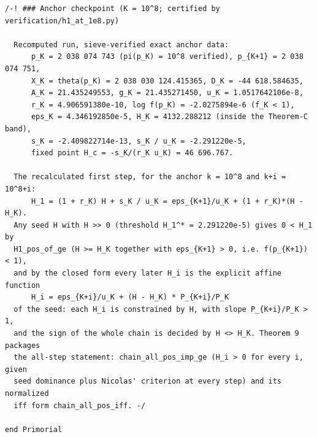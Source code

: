 \documentclass[11pt]{article}
\theoremstyle{remark}
\begin{document}
\begin{verbatim}
/-! ### Anchor checkpoint (K = 10^8; certified by verification/h1_at_1e8.py)

  Recomputed run, sieve-verified exact anchor data:
      p_K = 2 038 074 743 (pi(p_K) = 10^8 verified), p_{K+1} = 2 038 074 751,
      X_K = theta(p_K) = 2 038 030 124.415365, D_K = -44 618.584635,
      A_K = 21.435249553, g_K = 21.435271450, u_K = 1.0517642106e-8,
      r_K = 4.906591380e-10, log f(p_K) = -2.0275894e-6 (f_K < 1),
      eps_K = 4.346192850e-5, H_K = 4132.288212 (inside the Theorem-C band),
      s_K = -2.409822714e-13, s_K / u_K = -2.291220e-5,
      fixed point H_c = -s_K/(r_K u_K) = 46 696.767.

  The recalculated first step, for the anchor k = 10^8 and k+i = 10^8+i:
      H_1 = (1 + r_K) H + s_K / u_K = eps_{K+1}/u_K + (1 + r_K)*(H - H_K).
  Any seed H with H >> 0 (threshold H_1^* = 2.291220e-5) gives 0 < H_1 by
  H1_pos_of_ge (H >= H_K together with eps_{K+1} > 0, i.e. f(p_{K+1}) < 1),
  and by the closed form every later H_i is the explicit affine function
      H_i = eps_{K+i}/u_K + (H - H_K) * P_{K+i}/P_K
  of the seed: each H_i is constrained by H, with slope P_{K+i}/P_K > 1,
  and the sign of the whole chain is decided by H <> H_K. Theorem 9 packages
  the all-step statement: chain_all_pos_imp_ge (H_i > 0 for every i, given
  seed dominance plus Nicolas' criterion at every step) and its normalized
  iff form chain_all_pos_iff. -/

end Primorial
\end{verbatim}
\end{document}
